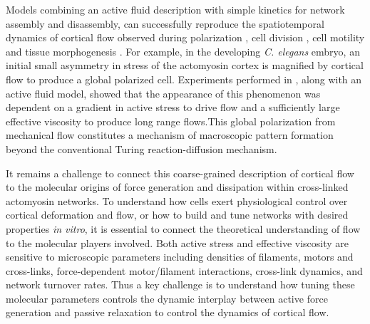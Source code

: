 Models combining an active fluid description with simple kinetics for network assembly and disassembly, can successfully reproduce the spatiotemporal dynamics of cortical flow observed during polarization \cite{cellmech_flows}, cell division \cite{Turlier2014114,PhysRevLett.103.058102}, cell motility \cite{Keren:2009aa,RevModPhys.85.1143} and tissue morphogenesis \cite{Behrndt257}.  For example, in the developing \textit{C. elegans} embryo, an initial small asymmetry in stress of the actomyosin cortex is magnified by cortical flow to produce a global polarized cell\cite{Munro2004413}.  Experiments performed in \cite{cellmech_flows}, along with an active fluid model, showed that the appearance of this phenomenon was dependent on a gradient in active stress to drive flow and a sufficiently large effective viscosity to produce long range flows.This global polarization from mechanical flow constitutes a mechanism of macroscopic pattern formation beyond the conventional Turing reaction-diffusion mechanism\cite{Howard2011}. 

It remains a challenge to connect this coarse-grained description of cortical flow to the molecular origins of force generation and dissipation within cross-linked actomyosin networks.  To  understand how cells exert physiological control over cortical deformation and flow, or how to build and tune networks with desired properties \textit{in vitro}, it is essential to connect the theoretical understanding of flow to the molecular players involved.  Both active stress and effective viscosity are sensitive to microscopic parameters including densities of filaments, motors and cross-links, force-dependent motor/filament interactions, cross-link dynamics, and network turnover rates.  Thus a key challenge is to understand how tuning these molecular parameters controls the dynamic interplay between active force generation and passive relaxation to control the dynamics of cortical flow.


